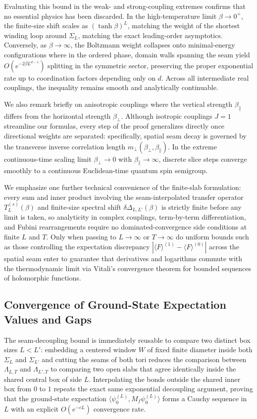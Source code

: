\documentclass[11pt]{article}
\theoremstyle{definition}
\begin{document}
Evaluating this bound in the weak- and strong-coupling extremes confirms that no
essential physics has been discarded. In the high-temperature limit $\beta \to 0^+$,
the finite-size shift scales as $(\tanh \beta)^L$, matching the weight of the
shortest winding loop around $\Sigma_L$, matching the exact leading-order
asymptotics. Conversely, as $\beta \to \infty$, the Boltzmann weight collapses onto
minimal-energy configurations where in the ordered phase, domain walls spanning the
seam yield $O(e^{-2\beta L^{d-1}})$ splitting in the symmetric sector, preserving
the proper exponential rate up to coordination factors depending only on $d$. Across
all intermediate real couplings, the inequality remains smooth and analytically
continuable.

We also remark briefly on anisotropic couplings where the vertical strength
$\beta_\parallel$ differs from the horizontal strength $\beta_\perp$. Although
isotropic couplings $J = 1$ streamline our formulas, every step of the proof
generalizes directly once directional weights are separated: specifically, spatial
seam decay is governed by the transverse inverse correlation length
$m_\perp(\beta_\perp, \beta_\parallel)$. In the extreme continuous-time scaling
limit $\beta_\perp \to 0$ with $\beta_\parallel \to \infty$, discrete slice steps
converge smoothly to a continuous Euclidean-time quantum spin semigroup.

We emphasize one further technical convenience of the finite-slab formulation: every
sum and inner product involving the seam-interpolated transfer operator
$T_L^{(s)}(\beta)$ and finite-size spectral shift $\delta\Delta_{L,L'}(\beta)$ is
strictly finite before any limit is taken, so analyticity in complex couplings,
term-by-term differentiation, and Fubini rearrangements require no
dominated-convergence side conditions at finite $L$ and $T$. Only when passing to $L
\to \infty$ or $T \to \infty$ do uniform bounds such as those controlling the
expectation discrepancy $|\langle F \rangle^{(1)} - \langle F \rangle^{(0)}|$ across
the spatial seam enter to guarantee that derivatives and logarithms commute with the
thermodynamic limit via Vitali's convergence theorem for bounded sequences of
holomorphic functions.

\subsection{Convergence of Ground-State Expectation Values and Gaps}
\label{subsec:s09b}

The seam-decoupling bound is immediately reusable to compare two distinct box sizes
$L < L'$: embedding a centered window $W$ of fixed finite diameter inside both
$\Sigma_L$ and $\Sigma_{L'}$ and cutting the seams of both tori reduces the
comparison between $\Lambda_{L,T}$ and $\Lambda_{L',T}$ to comparing two open slabs
that agree identically inside the shared central box of side $L$. Interpolating the
bonds outside the shared inner box from $0$ to $1$ repeats the exact same
exponential decoupling argument, proving that the ground-state expectation $\langle
\psi_0^{(L)}, M_f \psi_0^{(L)} \rangle$ forms a Cauchy sequence in $L$ with an
explicit $O(e^{-c L})$ convergence rate.
\end{document}
